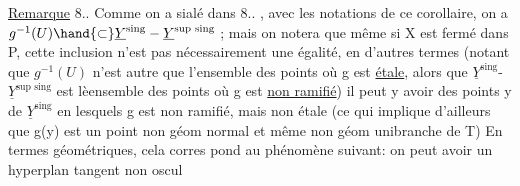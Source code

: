 \uline{Remarque} 8..  Comme on a sialé dans  8.. , avec les notations de
ce corollaire, on a  $g^{-1}(U) \hand{\subset} \underline{Y}^{\text{sing}} - \underline{Y}^{\text{sup sing}}$ ; mais on notera que
même si X est fermé dans P,  cette inclusion n'est pas nécessairement
 une égalité, en d'autres termes (notant que $g^{-1}(U)$ n'est autre que
l'ensemble des points où g est \uline{étale}, alors que $\underline{Y}^{\text{sing}}$-$\underline{Y}^{\text{sup sing}}$ est
lèensemble des points où g est \uline{non ramifié}) il peut y avoir des points
y de $\underline{Y}^{\text{sing}}$ en lesquels  g est  non ramifié, mais non étale (ce qui
 implique d'ailleurs que g(y) est un point non  géom normal et même
non géom unibranche de  T)  En termes géométriques, cela corres%
pond au phénomène suivant: on peut avoir un hyperplan tangent non oscul
